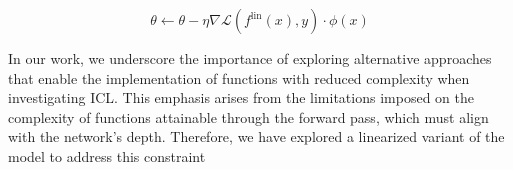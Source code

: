 \[
\theta \xleftarrow{} \theta - \eta \nabla\mathcal{L}(f^{\textrm{lin}} (x), y) \cdot \phi(x)
\]

In our work, we underscore the importance of exploring alternative approaches that enable the implementation of functions with reduced complexity when investigating ICL. This emphasis arises from the limitations imposed on the complexity of functions attainable through the forward pass, which must align with the network's depth. Therefore, we have explored a linearized variant of the model to address this constraint